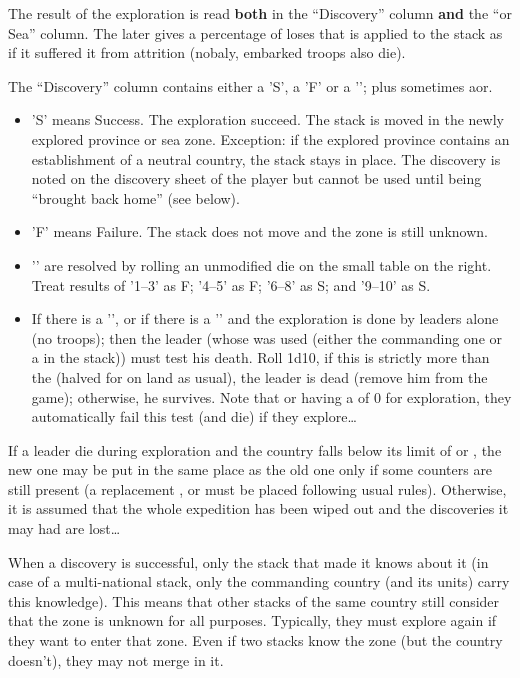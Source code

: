 The result of the exploration is read \textbf{both} in the ``Discovery''
column \textbf{and} the ``\ROTW or Sea'' column. The later gives a percentage
of loses that is applied to the stack as if it suffered it from
attrition (nobaly, embarked troops also die).

The ``Discovery'' column contains either a 'S', a 'F' or a '\undemi'; plus
sometimes a\myxxa or\myxxc.
\begin{itemize}
\item 'S' means Success. The exploration succeed. The stack is moved in the
  newly explored province or sea zone. Exception: if the explored province
  contains an establishment of a neutral country, the stack stays in
  place. The discovery is noted on the discovery sheet of the player but
  cannot be used until being ``brought back home'' (see below).
\item 'F' means Failure. The stack does not move and the zone is still
  unknown.
\item '\undemi' are resolved by rolling an unmodified die on the small table
  on the right. Treat results of '1--3' as F\xxa; '4--5' as F\xxc; '6--8'
  as S\xxa; and '9--10' as S\xxc.
\item If there is a '\xxa', or if there is a '\xxc' and the exploration is
  done by leaders alone (no troops); then the leader (whose \Man was used
  (either the commanding one or a \LeaderMis in the stack)) must test his
  death. Roll 1d10, if this is strictly more than the \Man (halved for
  \LeaderE on land as usual), the leader is dead (remove him from the game);
  otherwise, he survives. Note that \LeaderA or \LeaderG having a \Man of 0
  for exploration, they automatically fail this test (and die) if they
  explore\ldots
\end{itemize}

If a leader die during exploration and the country falls below its limit of
\LeaderC or \LeaderE, the new one may be put in the same place as the old one
only if some counters are still present (a replacement \LeaderA, \LeaderG or
\LeaderGov must be placed following usual rules). Otherwise, it is assumed
that the whole expedition has been wiped out and the discoveries it may had
are lost\ldots

\smallskip

When a discovery is successful, only the stack that made it knows about it (in
case of a multi-national stack, only the commanding country (and its units)
carry this knowledge). This means that other stacks of the same country still
consider that the zone is unknown for all purposes. Typically, they must
explore again if they want to enter that zone. Even if two stacks know the
zone (but the country doesn't), they may not merge in it.

